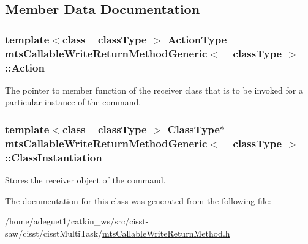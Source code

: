 \subsection{Member Data Documentation}
\hypertarget{classmts_callable_write_return_method_generic_a26ed7c8f096968628c889c74c330ef56}{
\subsubsection[{Action}]{\setlength{\rightskip}{0pt plus 5cm}template$<$class \-\_\-class\-Type $>$ {\bf Action\-Type} {\bf mts\-Callable\-Write\-Return\-Method\-Generic}$<$ \-\_\-class\-Type $>$\-::Action\hspace{0.3cm}{\ttfamily [protected]}}}\label{classmts_callable_write_return_method_generic_a26ed7c8f096968628c889c74c330ef56}
The pointer to member function of the receiver class that is to be invoked for a particular instance of the command. \hypertarget{classmts_callable_write_return_method_generic_a8439ed2ecdee526070cb9f7d34cd100b}{
\subsubsection[{Class\-Instantiation}]{\setlength{\rightskip}{0pt plus 5cm}template$<$class \-\_\-class\-Type $>$ {\bf Class\-Type}$\ast$ {\bf mts\-Callable\-Write\-Return\-Method\-Generic}$<$ \-\_\-class\-Type $>$\-::Class\-Instantiation\hspace{0.3cm}{\ttfamily [protected]}}}\label{classmts_callable_write_return_method_generic_a8439ed2ecdee526070cb9f7d34cd100b}
Stores the receiver object of the command. 

The documentation for this class was generated from the following file\-:\begin{DoxyCompactItemize}
\item 
/home/adeguet1/catkin\-\_\-ws/src/cisst-\/saw/cisst/cisst\-Multi\-Task/\hyperlink{mts_callable_write_return_method_8h}{mts\-Callable\-Write\-Return\-Method.\-h}\end{DoxyCompactItemize}
